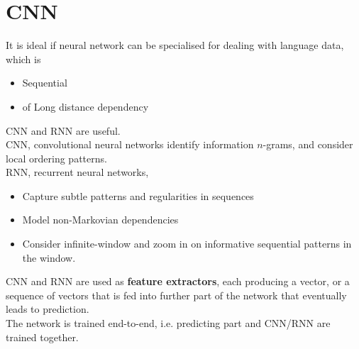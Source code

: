 \documentclass[12pt]{article}
\theoremstyle{definition}
\begin{document}
\section{CNN}
It is ideal if neural network can be specialised for dealing with language data, which is 
\begin{itemize}
	\item Sequential
	\item of Long distance dependency
\end{itemize}
CNN and RNN are useful.\\
CNN, convolutional neural networks identify information $n$-grams, and consider local ordering patterns. \\RNN, recurrent neural networks,
\begin{itemize}
\item Capture subtle patterns and regularities in sequences
\item Model non-Markovian dependencies
\item Consider infinite-window and zoom in on informative sequential patterns in the window.
\end{itemize}
 CNN and RNN are used as \textbf{feature extractors}, each producing a vector, or a sequence of vectors that is fed into further part of the network that eventually leads to prediction.\\
 The network is trained end-to-end, i.e. predicting part and CNN/RNN are trained together.
\end{document}
